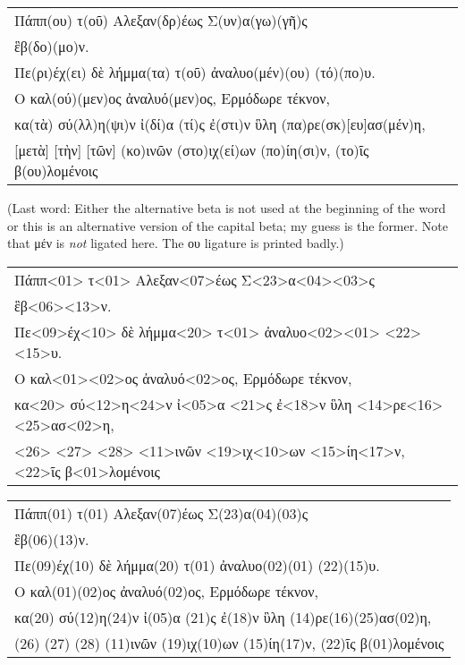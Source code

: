 \begin{typeGreek}
\begin{tabular}{l}
Πάππ(ου) τ(οῦ) Αλεξαν(δρ)έως Σ(υν)α(γω)(γῆ)ς \\ 
ἓβ(δο)(μο)ν. \\ 
Πε(ρι)έχ(ει) δὲ λήμμα(τα) τ(οῦ) ἀναλυο(μέν)(ου) (τό)(πο)υ. \\ 
Ο καλ(ού)(μεν)ος ἀναλυό(μεν)ος, Ερμόδωρε τέκνον, \\ 
κα(τὰ) σύ(λλ)η(ψι)ν ἰ(δί)α (τί)ς ἐ(στι)ν ὓλη (πα)ρε(σκ)[ευ]ασ(μέν)η, \\{}
[μετὰ] [τὴν] [τῶν] (κο)ινῶν (στο)ιχ(εί)ων (πο)ίη(σι)ν, (το)ῖς β(ου)λομένοις \\ 
\end{tabular}
\end{typeGreek}

(Last word: Either the alternative beta is not used at the beginning of the word or this is an alternative version of the capital beta; my guess is the former. Note that μέν is \emph{not} ligated here. The ου ligature is printed badly.)

\begin{typeGreek}
\begin{tabular}{l}
Πάππ<01> τ<01> Αλεξαν<07>έως Σ<23>α<04><03>ς \\ 
ἓβ<06><13>ν. \\ 
Πε<09>έχ<10> δὲ λήμμα<20> τ<01> ἀναλυο<02><01> <22><15>υ. \\ 
Ο καλ<01><02>ος ἀναλυό<02>ος, Ερμόδωρε τέκνον, \\ 
κα<20> σύ<12>η<24>ν ἰ<05>α <21>ς ἐ<18>ν ὓλη <14>ρε<16><25>ασ<02>η, \\ 
<26> <27> <28>  <11>ινῶν <19>ιχ<10>ων <15>ίη<17>ν, <22>ῖς β<01>λομένοις \\ 
\end{tabular}
\end{typeGreek}

\begin{typeGreek}
\begin{tabular}{l}
Πάππ(01) τ(01) Αλεξαν(07)έως Σ(23)α(04)(03)ς \\ 
ἓβ(06)(13)ν. \\ 
Πε(09)έχ(10) δὲ λήμμα(20) τ(01) ἀναλυο(02)(01) (22)(15)υ. \\ 
Ο καλ(01)(02)ος ἀναλυό(02)ος, Ερμόδωρε τέκνον, \\ 
κα(20) σύ(12)η(24)ν ἰ(05)α (21)ς ἐ(18)ν ὓλη (14)ρε(16)(25)ασ(02)η, \\ 
(26) (27) (28)  (11)ινῶν (19)ιχ(10)ων (15)ίη(17)ν, (22)ῖς β(01)λομένοις \\ 
\end{tabular}
\end{typeGreek}

